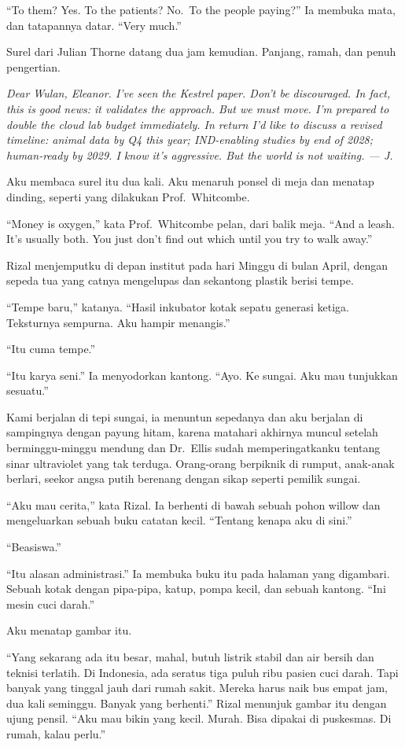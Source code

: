 \documentclass[11pt,twoside,openany]{book}
\makeatletter
\newcommand{\scenebreak}{\par\vspace{0.9em}{\centering\textsc{*\hspace{0.7em}*\hspace{0.7em}*}\par}\vspace{0.9em}\@afterindentfalse\@afterheading}
\makeatother
\begin{document}
``To them? Yes. To the patients? No.~To the people paying?'' Ia membuka mata, dan tatapannya datar. ``Very much.''

Surel dari Julian Thorne datang dua jam kemudian. Panjang, ramah, dan penuh pengertian.

\emph{Dear Wulan, Eleanor. I've seen the Kestrel paper. Don't be discouraged. In fact, this is good news: it validates the approach. But we must move. I'm prepared to double the cloud lab budget immediately. In return I'd like to discuss a revised timeline: animal data by Q4 this year; IND-enabling studies by end of 2028; human-ready by 2029. I know it's aggressive. But the world is not waiting. --- J.}

Aku membaca surel itu dua kali. Aku menaruh ponsel di meja dan menatap dinding, seperti yang dilakukan Prof.~Whitcombe.

``Money is oxygen,'' kata Prof.~Whitcombe pelan, dari balik meja. ``And a leash. It's usually both. You just don't find out which until you try to walk away.''

\scenebreak
Rizal menjemputku di depan institut pada hari Minggu di bulan April, dengan sepeda tua yang catnya mengelupas dan sekantong plastik berisi tempe.

``Tempe baru,'' katanya. ``Hasil inkubator kotak sepatu generasi ketiga. Teksturnya sempurna. Aku hampir menangis.''

``Itu cuma tempe.''

``Itu karya seni.'' Ia menyodorkan kantong. ``Ayo. Ke sungai. Aku mau tunjukkan sesuatu.''

Kami berjalan di tepi sungai, ia menuntun sepedanya dan aku berjalan di sampingnya dengan payung hitam, karena matahari akhirnya muncul setelah berminggu-minggu mendung dan Dr.~Ellis sudah memperingatkanku tentang sinar ultraviolet yang tak terduga. Orang-orang berpiknik di rumput, anak-anak berlari, seekor angsa putih berenang dengan sikap seperti pemilik sungai.

``Aku mau cerita,'' kata Rizal. Ia berhenti di bawah sebuah pohon willow dan mengeluarkan sebuah buku catatan kecil. ``Tentang kenapa aku di sini.''

``Beasiswa.''

``Itu alasan administrasi.'' Ia membuka buku itu pada halaman yang digambari. Sebuah kotak dengan pipa-pipa, katup, pompa kecil, dan sebuah kantong. ``Ini mesin cuci darah.''

Aku menatap gambar itu.

``Yang sekarang ada itu besar, mahal, butuh listrik stabil dan air bersih dan teknisi terlatih. Di Indonesia, ada seratus tiga puluh ribu pasien cuci darah. Tapi banyak yang tinggal jauh dari rumah sakit. Mereka harus naik bus empat jam, dua kali seminggu. Banyak yang berhenti.'' Rizal menunjuk gambar itu dengan ujung pensil. ``Aku mau bikin yang kecil. Murah. Bisa dipakai di puskesmas. Di rumah, kalau perlu.''
\end{document}

